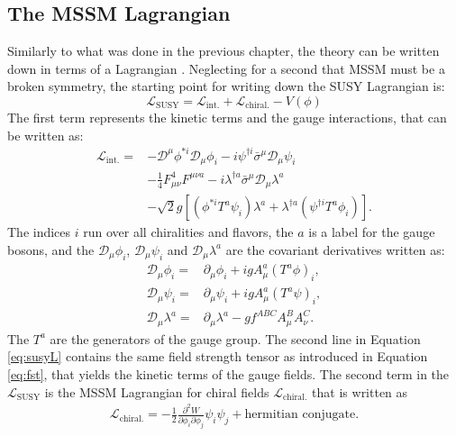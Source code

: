 \subsection*{The MSSM Lagrangian}
\noindent\justify
Similarly to what was done in the previous chapter, the theory can be written down in terms of a Lagrangian \cite{Pape:2006ar}. 
Neglecting for a second that MSSM must be a broken symmetry, the starting point for writing down the SUSY Lagrangian is:
\begin{equation} 
\mathcal{L}_{\mathrm{SUSY}}=\mathcal{L}_{\mathrm{int.}}+\mathcal{L}_{\mathrm{chiral.}}- V(\phi)
\end{equation}
The first term represents the kinetic terms and the gauge interactions, that can be written as:
\begin{align} 
\mathcal{L}_{\mathrm{int.}}=&-\mathcal{D}^{\mu}\phi^{*i}\mathcal{D}_{\mu}\phi_{i}-i\psi^{\dagger i}\bar{\sigma}^{\mu}\mathcal{D}_{\mu}\psi_{i}\\
                   &-\frac{1}{4}F_{\mu\nu}^{4}F^{\mu\nu a}-i\lambda^{\dagger a}\bar{\sigma}^{\mu}\mathcal{D}_{\mu}\lambda^{a}\\
                   &-\sqrt{2}g[(\phi^{*i}T^{a}\psi_{i})\lambda^{a}+\lambda^{\dagger a}(\psi^{\dagger i}T^{a}\phi_{i})].
\label{eq:susyL}
\end{align}
The indices $i$ run over all chiralities and flavors, the $a$ is a label for the gauge bosons, and the $\mathcal{D}_{\mu}\phi_{i}$, $\mathcal{D}_{\mu}\psi_{i}$ and $\mathcal{D}_{\mu}\lambda^{a}$ are the covariant derivatives written as:
\begin{align} 
\mathcal{D}_{\mu}\phi_{i}=&\partial_{\mu}\phi_{i}+igA_{\mu}^{a}(T^{a}\phi)_{i},\\
\mathcal{D}_{\mu}\psi_{i}=&\partial_{\mu}\psi_{i}+igA_{\mu}^{a}(T^{a}\psi)_{i},\\
\mathcal{D}_{\mu}\lambda^{a}=&\partial_{\mu}\lambda^{a}-g f^{ABC}A_{\mu}^{B}A_{\nu}^{C}.
\end{align}
The $T^{a}$ are the generators of the gauge group. 
The second line in Equation \ref{eq:susyL} contains the same field strength tensor as introduced in Equation \ref{eq:fst}, that yields the kinetic terms of the gauge fields.
The second term in the $\mathcal{L}_{\mathrm{SUSY}}$ is the MSSM Lagrangian for chiral fields $\mathcal{L}_{\mathrm{chiral.}}$ that is written as 
\begin{align} 
\mathcal{L}_{\mathrm{chiral.}}=-\frac{1}{2}\frac{\partial^{2}W}{\partial \phi_{i}\partial \phi_{j}}\psi_{i}\psi_{j}+\mathrm{hermitian\,\,conjugate}.
\end{align}
